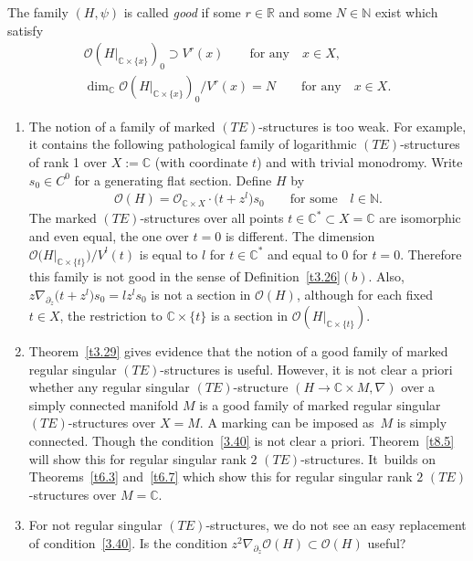 \documentclass[10pt,a4paper]{amsart}
\numberwithin{equation}{section}
\numberwithin{figure}{section}
\newcommand{\N}{{\mathbb N}}
\newcommand{\C}{{\mathbb C}}
\newcommand{\R}{{\mathbb R}}
\newcommand{\OO}{{\mathcal O}}
\newcommand{\paa}{\partial}
\newcommand{\nnn}{\nabla}
\begin{document}
\begin{Definition}
The family $(H,\psi)$ is called {\it good} if some $r\in\R$
and some $N\in\N$ exist which satisfy
\begin{gather}\label{3.39}
\OO(H|_{\C\times\{x\}})_0\supset V^{r}(x)
\qquad\text{for any}\quad x\in X,
\\
\dim_\C \OO(H|_{\C\times\{x\}})_0/V^{r}(x)=N
\qquad\text{for any}\quad x\in X.\label{3.40}
\end{gather}
\end{Definition}


\begin{Remarks}%
\qquad
\begin{enumerate}\itemsep=0pt
\item[$(i)$] The notion of a family of marked $(TE)$-structures
is too weak. For example, it contains the following
pathological family of logarithmic $(TE)$-structures
of rank 1 over $X:=\C$ (with coordinate $t$)
and with trivial monodromy. Write $s_0\in C^0$ for a
generating flat section. Define $H$ by
\begin{gather*}%
\OO(H)=\OO_{\C\times X}\cdot \big(t+z^l\big)s_0\qquad \text{for some}\quad l\in\N.
\end{gather*}
The marked $(TE)$-structures over all points $t\in\C^*\subset X=\C$
are isomorphic and even equal, the one over $t=0$ is
different. The dimension $\OO\big(H|_{\C\times\{t\}}\big)/V^l(t)$
is equal to $l$ for $t\in \C^*$ and equal to $0$ for $t=0$.
Therefore this family is not good in the sense of
Definition~\ref{t3.26}$(b)$.
Also, $z\nnn_{\paa_z}\big(t+z^l\big)s_0=lz^ls_0$ is not a
section in $\OO(H)$, although for each fixed $t\in X$,
the restriction to $\C\times\{t\}$ is a section in
$\OO(H|_{\C\times \{t\}})$.

\item[$(ii)$] Theorem~\ref{t3.29} gives evidence that the notion
of a good family of marked regular singular $(TE)$-structures
is useful. However, it is not clear a priori whether any
regular singular $(TE)$-structure $(H\to\C\times M,\nnn)$
over a simply connected manifold $M$ is a good family
of marked regular singular $(TE)$-structures over $X=M$.
A marking can be imposed as~$M$ is simply connected.
Though the condition~\eqref{3.40} is not clear a priori.
Theorem~\ref{t8.5} will show this for regular singular
rank $2$ $(TE)$-structures. It~builds on Theorems~\ref{t6.3} and~\ref{t6.7} which show this for
regular singular rank $2$ $(TE)$-structures over $M=\C$.

\item[$(iii)$] For not regular singular $(TE)$-structures,
we do not see an easy replacement of condition~\eqref{3.40}.
Is the condition $z^2\nnn_{\paa_z}\OO(H)\subset\OO(H)$
useful?
\end{enumerate}
\end{Remarks}
\end{document}
